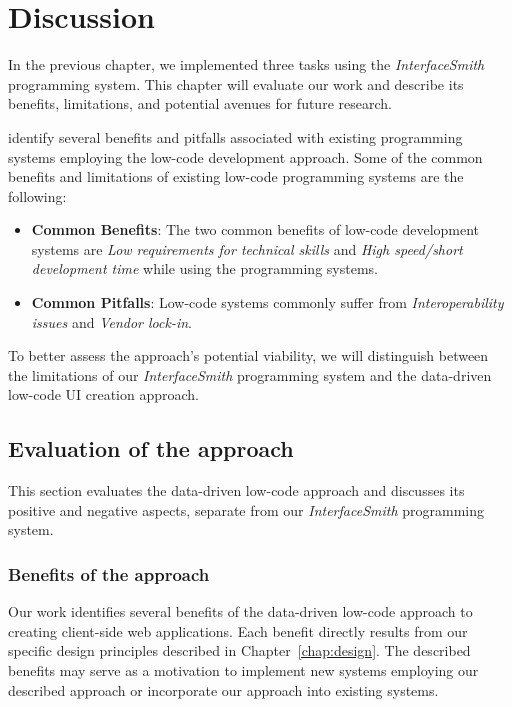\chapter{Discussion}
\label{chap:discussion}

In the previous chapter, we implemented three tasks using the \emph{InterfaceSmith} programming system.
This chapter will evaluate our work and describe its benefits, limitations, and potential avenues for future research.

\citet{Pinho_Aguiar_Amaral_2023} identify several benefits and pitfalls associated with existing programming systems employing the low-code development approach.
Some of the common benefits and limitations of existing low-code programming systems are the following:
\begin{itemize}
	\item \textbf{Common Benefits}: The two common benefits of low-code development systems are \emph{Low requirements for technical skills} and \emph{High speed/short development time} while using the programming systems.
	\item \textbf{Common Pitfalls}: Low-code systems commonly suffer from \emph{Interoperability issues} and \emph{Vendor lock-in}.
\end{itemize}

\noindent
To better assess the approach's potential viability, we will distinguish between the limitations of our \emph{InterfaceSmith} programming system and the data-driven low-code UI creation approach.

\medskip
\section{Evaluation of the approach}
This section evaluates the data-driven low-code approach and discusses its positive and negative aspects, separate from our \emph{InterfaceSmith} programming system.
\medskip
\subsection{Benefits of the approach}

Our work identifies several benefits of the data-driven low-code approach to creating client-side web applications.
Each benefit directly results from our specific design principles described in Chapter~\ref{chap:design}.
The described benefits may serve as a motivation to implement new systems employing our described approach or incorporate our approach into existing systems.

